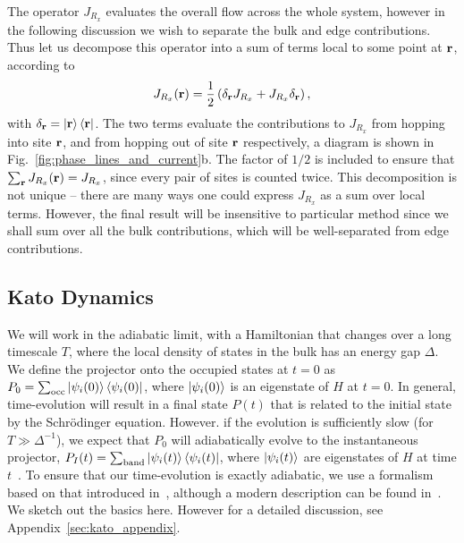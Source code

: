 The operator $J_{R_x}$ evaluates the overall flow across the whole system, however in the following discussion we wish to separate the bulk and edge contributions. Thus let us decompose this operator into a sum of terms local to some point at $\textbf r$, according to
\begin{align}\label{eqn:current_operator}
    J_{R_x}(\textbf r) = \frac{1}{2} \left (
    \delta_{\textbf r} J_{R_x} +
    J_{R_x} \delta_{\textbf r}  \right ),
\end{align}
with $\delta_{\textbf r} = \ket{\textbf r}\bra{\textbf r}$. The two terms evaluate the contributions to $J_{R_x}$ from hopping into site $\textbf r$, and from hopping out of site $\textbf r$ respectively, a diagram is shown in Fig.~\ref{fig:phase_lines_and_current}b. The factor of $1/2$ is included to ensure that $\sum_{\textbf r}J_{R_x}(\textbf r) = J_{R_x}$, since every pair of sites is counted twice. This decomposition is not unique --  there are many ways one could express $J_{R_x}$ as a sum over local terms. However, the final result will be insensitive to particular method since we shall sum over all the bulk contributions, which will be well-separated from edge contributions.

\subsection{Kato Dynamics}\label{sec:kato}
We will work in the adiabatic limit, with a Hamiltonian that changes over a long timescale $T$, where the local density of states in the bulk has an energy gap $\Delta$. We define the projector onto the occupied states at $t = 0$ as $P_0 = \sum_{\textup{occ}}\ket{\psi_i(0)} \bra{\psi_i(0)}$, where $\ket{\psi_i(0)}$ is an eigenstate of $H$ at $t = 0$. In general, time-evolution will result in a final state $P(t)$ that is related to the initial state by the Schr\"odinger equation. However. if the evolution is sufficiently slow (for $T\gg \Delta^{-1}$), we expect that $P_0$ will adiabatically evolve to the instantaneous projector, $P_{I}(t) =\sum_{\textup{band}}\ket{\psi_i(t)} \bra{\psi_i(t)} $, where $\ket{\psi_i(t)}$ are eigenstates of $H$ at time $t$~\cite{avron_adiabatic_1987}. To ensure that our time-evolution is exactly adiabatic, we use a formalism based on that introduced in~\cite{kato_adiabatic_1950}, although a modern description can be found in~\cite{simon_tosio_2018,avron_adiabatic_1987,avron_adiabatic_1999}. We sketch out the basics here. However for a detailed discussion, see Appendix~\ref{sec:kato_appendix}. 

